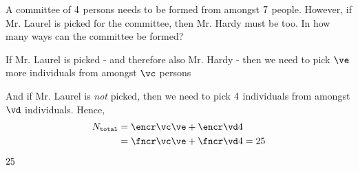 



\SUBTRACT{}\vc
\SUBTRACT{}\vd 
\SUBTRACT{}\ve

\question[2] A committee of $4$ persons needs to be formed from amongst $7$ people. However, 
if Mr. Laurel is picked for the committee, then Mr. Hardy must be too. In how many 
ways can the committee be formed?


\watchout[-30pt]

\begin{solution}[\mcq]
	If Mr. Laurel is picked - and therefore also Mr. Hardy - then we need to pick $\ve$ more individuals 
	from amongst $\vc$ persons
	
	And if Mr. Laurel is \textit{not} picked, then we need to pick $4$ individuals from amongst $\vd$ individuals. Hence,
	\begin{align}
		N_{\texttt{total}} &= \encr\vc\ve + \encr\vd\va \\
		&= \fncr\vc\ve + \fncr\vd\va = \vf \\
	\end{align}
\end{solution}

\ifprintanswers
  \begin{codex}
    $25$
  \end{codex}
\fi 

